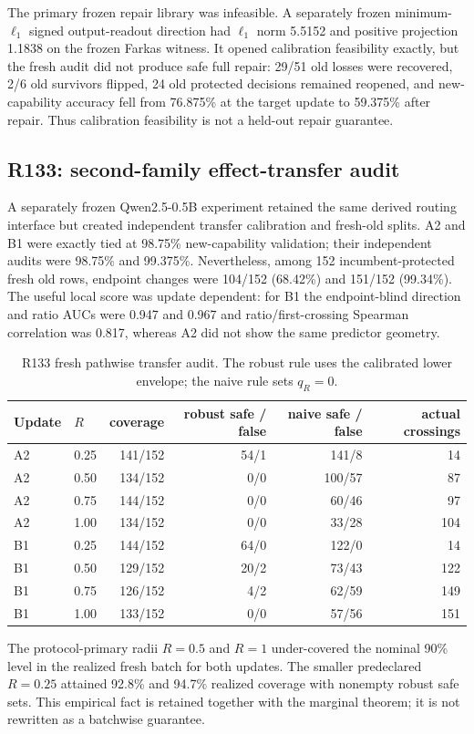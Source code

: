 \documentclass[11pt,letterpaper]{article}
\theoremstyle{plain}
\newcommand{\1}{\mathbf 1}
\begin{document}
The primary frozen repair library was infeasible. A separately frozen minimum-$\ell_1$ signed output-readout direction had $\ell_1$ norm 5.5152 and positive projection 1.1838 on the frozen Farkas witness. It opened calibration feasibility exactly, but the fresh audit did not produce safe full repair: 29/51 old losses were recovered, 2/6 old survivors flipped, 24 old protected decisions remained reopened, and new-capability accuracy fell from 76.875\% at the target update to 59.375\% after repair. Thus calibration feasibility is not a held-out repair guarantee.

\subsection{R133: second-family effect-transfer audit}
A separately frozen Qwen2.5-0.5B experiment retained the same derived routing interface but created independent transfer calibration and fresh-old splits. A2 and B1 were exactly tied at 98.75\% new-capability validation; their independent audits were 98.75\% and 99.375\%. Nevertheless, among 152 incumbent-protected fresh old rows, endpoint changes were 104/152 (68.42\%) and 151/152 (99.34\%). The useful local score was update dependent: for B1 the endpoint-blind direction and ratio AUCs were 0.947 and 0.967 and ratio/first-crossing Spearman correlation was 0.817, whereas A2 did not show the same predictor geometry.

\begin{table}[H]
\centering
\caption{R133 fresh pathwise transfer audit. The robust rule uses the calibrated lower envelope; the naive rule sets $q_R=0$.}
\label{tab:r137_r133}
\small
\begin{tabular}{llrrrr}
\toprule
Update & $R$ & coverage & robust safe / false & naive safe / false & actual crossings\\
\midrule
A2 & 0.25 & 141/152 & 54/1 & 141/8 & 14\\
A2 & 0.50 & 134/152 & 0/0 & 100/57 & 87\\
A2 & 0.75 & 144/152 & 0/0 & 60/46 & 97\\
A2 & 1.00 & 134/152 & 0/0 & 33/28 & 104\\
B1 & 0.25 & 144/152 & 64/0 & 122/0 & 14\\
B1 & 0.50 & 129/152 & 20/2 & 73/43 & 122\\
B1 & 0.75 & 126/152 & 4/2 & 62/59 & 149\\
B1 & 1.00 & 133/152 & 0/0 & 57/56 & 151\\
\bottomrule
\end{tabular}
\end{table}
The protocol-primary radii $R=0.5$ and $R=1$ under-covered the nominal 90\% level in the realized fresh batch for both updates. The smaller predeclared $R=0.25$ attained 92.8\% and 94.7\% realized coverage with nonempty robust safe sets. This empirical fact is retained together with the marginal theorem; it is not rewritten as a batchwise guarantee.
\end{document}
